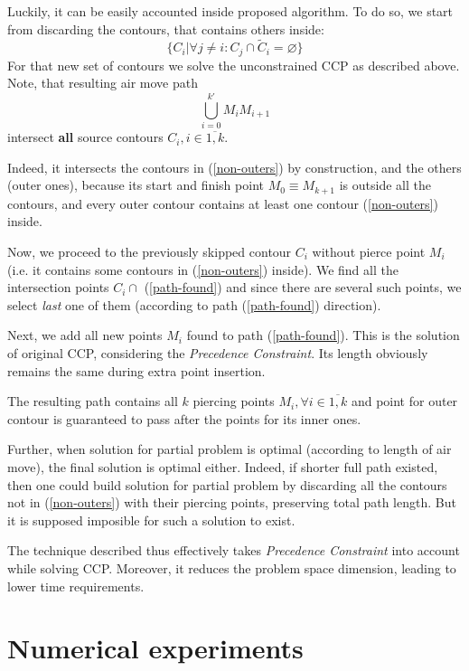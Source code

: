 \documentclass{ifacconf}
\begin{document}
Luckily, it can be easily accounted
inside proposed algorithm.
To do so,
we start from discarding the contours,
that contains others inside:
\begin{equation}
\big\{
    C_i | \forall j \ne i: C_j \cap \tilde C_i = \varnothing
\big\}
\label{non-outers}
\end{equation}
For that new set of contours
we solve the unconstrained CCP
as described above.
Note, that resulting air move path
\begin{equation}
  \bigcup_{i=0}^{k'} M_i M_{i+1}
\label{path-found}
\end{equation}
intersect \textbf{all}
source contours
$C_i, i \in \overline{1,k}$.

Indeed,
it intersects the contours in (\ref{non-outers})
by construction,
and the others
(outer ones),
because
its start and finish point
$M_0 \equiv M_{k+1}$
is outside all the contours,
and every outer contour
contains at least one contour
(\ref{non-outers}) inside.

Now,
we proceed to the
previously skipped contour $C_i$
without pierce point $M_i$
(i.e. it contains some contours in
(\ref{non-outers}) inside).
We find all the intersection
points $C_i \cap $ (\ref{path-found})
and since there are several such points,
we select \textit{last} one of them
(according to path (\ref{path-found}) direction).

Next, we add all new points $M_i$ found
to path (\ref{path-found}).
This is the solution of original CCP,
considering the
\textit{Precedence Constraint}.
Its length obviously remains the same
during extra point insertion.

The resulting path contains all $k$
piercing points
$M_i, \forall i \in \overline{1,k}$
and point for outer contour
is guaranteed to pass after
the points for its inner ones.

Further,
when solution for partial problem
is optimal
(according to length of air move),
the final solution
is optimal either.
Indeed,
if shorter full path existed,
then one could build solution
for partial problem
by discarding all the contours not in
(\ref{non-outers}) with their piercing points,
preserving total path length.
But it is supposed imposible
for such a solution to exist.

The technique described thus
effectively takes
\textit{Precedence Constraint}
into account while solving CCP.
Moreover,
it reduces the problem space dimension,
leading to lower time requirements.

\section{Numerical experiments}
\end{document}
